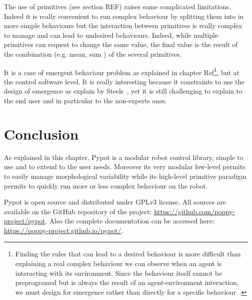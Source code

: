 The use of primitives (see section REF) raises some complicated limitations. Indeed it is really convenient to run complex behaviour by splitting them into in more simple behaviours but the interaction between primitives is really complex to manage and can lead to undesired behaviours. Indeed, while multiple primitives can request to change the same value, the final value is the result of the combination (e.g. mean, sum ) of the several primitives.

It is a case of emergent behaviour problem as explained in chapter Ref\footnote{Finding the rules that can lead to a desired behaviour is more difficult than explaining a real complex behaviour we can observe when an agent is interacting with its environment. Since the behaviour itself cannot be preprogramed but is always the result of an agent-environment interaction, we must design for emergence rather than directly for a specific behaviour~\cite{Pfeifer06}.}, but at the control software level. It is really interesting because it constraints to use the design of emergence as explain by Steels~\cite{Steels1991emergence}, yet it is still challenging to explain to the end user and in particular to the non-experts ones.


\section{Conclusion} %

As explained in this chapter, Pypot is a modular robot control library, simple to use and to extend to the user needs. Moreover its very modular low-level permits to easily manage morphological variability while its high-level primitive paradigm permits to quickly run more or less complex behaviour on the robot.

Pypot is open source and distributed under GPLv3 license. All sources are available on the GitHub repository of the project: \url{https://github.com/poppy-project/pypot}. Also the complete documentation can be accessed here: \url{https://poppy-project.github.io/pypot/}.





% 


